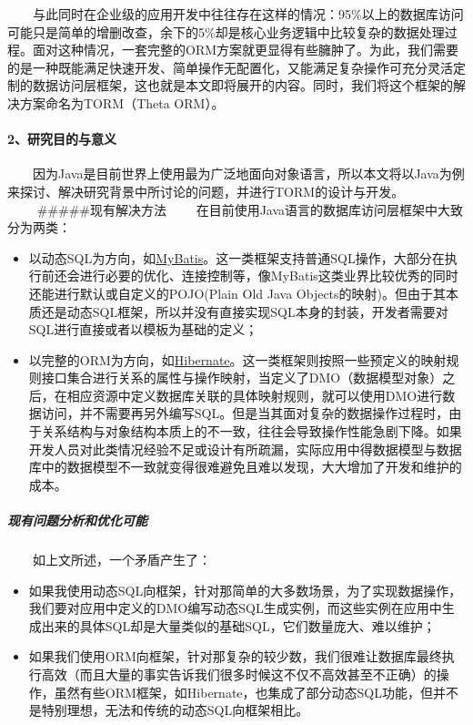\documentclass[]{article}
\begin{document}
　　与此同时在企业级的应用开发中往往存在这样的情况：95\%以上的数据库访问可能只是简单的增删改查，余下的5\%却是核心业务逻辑中比较复杂的数据处理过程。面对这种情况，一套完整的ORM方案就更显得有些臃肿了。为此，我们需要的是一种既能满足快速开发、简单操作无配置化，又能满足复杂操作可充分灵活定制的数据访问层框架，这也就是本文即将展开的内容。同时，我们将这个框架的解决方案命名为TORM（Theta
ORM）。

\paragraph{2、研究目的与意义}\label{ux7814ux7a76ux76eeux7684ux4e0eux610fux4e49}

　　因为Java是目前世界上使用最为广泛地面向对象语言，所以本文将以Java为例来探讨、解决研究背景中所讨论的问题，并进行TORM的设计与开发。
　　 \#\#\#\#\#现有解决方法
　　在目前使用Java语言的数据库访问层框架中大致分为两类：

\begin{itemize}
\itemsep1pt\parskip0pt
\item
  以动态SQL为方向，如\href{http://mybatis.github.io/}{MyBatis}。这一类框架支持普通SQL操作，大部分在执行前还会进行必要的优化、连接控制等，像MyBatis这类业界比较优秀的同时还能进行默认或自定义的POJO(Plain
  Old Java
  Objects的映射)。但由于其本质还是动态SQL框架，所以并没有直接实现SQL本身的封装，开发者需要对SQL进行直接或者以模板为基础的定义；
\item
  以完整的ORM为方向，如\href{http://www.hibernate.org/}{Hibernate}。这一类框架则按照一些预定义的映射规则接口集合进行关系的属性与操作映射，当定义了DMO（数据模型对象）之后，在相应资源中定义数据库关联的具体映射规则，就可以使用DMO进行数据访问，并不需要再另外编写SQL。但是当其面对复杂的数据操作过程时，由于关系结构与对象结构本质上的不一致，往往会导致操作性能急剧下降。如果开发人员对此类情况经验不足或设计有所疏漏，实际应用中得数据模型与数据库中的数据模型不一致就变得很难避免且难以发现，大大增加了开发和维护的成本。
\end{itemize}

\subparagraph{现有问题分析和优化可能}\label{ux73b0ux6709ux95eeux9898ux5206ux6790ux548cux4f18ux5316ux53efux80fd}

　　如上文所述，一个矛盾产生了：

\begin{itemize}
\itemsep1pt\parskip0pt
\item
  如果我使用动态SQL向框架，针对那简单的大多数场景，为了实现数据操作，我们要对应用中定义的DMO编写动态SQL生成实例，而这些实例在应用中生成出来的具体SQL却是大量类似的基础SQL，它们数量庞大、难以维护；
\item
  如果我们使用ORM向框架，针对那复杂的较少数，我们很难让数据库最终执行高效（而且大量的事实告诉我们很多时候这不仅不高效甚至不正确）的操作，虽然有些ORM框架，如Hibernate，也集成了部分动态SQL功能，但并不是特别理想，无法和传统的动态SQL向框架相比。　　
\end{itemize}
\end{document}
